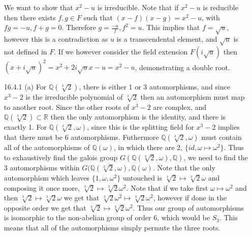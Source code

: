 \documentclass[12pt, letterpaper]{article}
\newcommand{\R}{\mathbb{R}}
\newcommand{\Q}{\mathbb{Q}}
\begin{document}
\begin{enumerate}
	We want to show that $x^2 - u$ is irreducible.  Note that if $x^2 - u$ is reducible then 
	there exists $f,g \in F$ such that $(x-f)(x-g) = x^2 - u$, with $fg = -u, f + g = 0$.  
	Therefore $g = \frac{-u}{f}, f^2 = u$.  This implies that $f = \sqrt{u}$, however this is 
	a contradiction as $u$ is a transcendental element, and $\sqrt{u}$ is not defined in 
	$F$.  If we however consider the field extension $F(i\sqrt{u})$ then 
	$(x + i\sqrt{u})^2 = x^2 + 2i\sqrt{u}x - u = x^2 - u$, demonstrating a double root.  
	\item[16.4.1 (a)] For $\Q(\sqrt[3]{2})$, there is either 1 or 3 automorphisms, 
	and since $x^3 - 2$ is the irreducible polynomial of $\sqrt[3]{2}$ then an automorphism 
	must map to another root.  Since the other roots of $x^3 - 2$ are complex, and 
	$\Q(\sqrt[3]{2}) \subset \R$ then the only automorphism is the identity, and there is 
	exactly 1.  For $\Q(\sqrt[3]{2},\omega)$, since this is the splitting field for 
	$x^3 -2$ implies that there must be 6 automorphisms.  Futhermore $\Q(\sqrt[3]{2},\omega)$
	must contain all of the automorphisms of $\Q(\omega)$, in which there are 2, 
	$\{id, \omega \mapsto \omega^2\}$.  Thus to exhaustively find
	the galois group $G(\Q(\sqrt[3]{2},\omega),\Q)$, we need to find the 3 automorphisms 
	within $G(\Q(\sqrt[3]{2},\omega),\Q(\omega)$.  Note that the only automorphism which leaves
	$\{1,\omega,\omega^2\}$ untouched is $\sqrt[3]{2} \mapsto \sqrt[3]{2} \omega$ and composing 		it once more, $\sqrt[3]{2} \mapsto \sqrt[3]{2} \omega^2$.  Note that if we take first 
	$\omega \mapsto \omega^2 $ and then $\sqrt[3]{2} \mapsto \sqrt[3]{2} \omega$ we get 
	that $\sqrt[3]{2} \omega^2 \mapsto \sqrt[3]{2} \omega^2$, however if done in the opposite 
	order we get that $\sqrt[3]{2} \mapsto \sqrt[3]{2} \omega^2$.  Thus our group of 
	automorphisms is isomorphic to the non-abelian group of order 6, which would be $S_3$.  
	This means that all of the automorphisms simply permute the three roots.    
	\iffalse Note that for $\Q(\sqrt[3]{2})$ there are 3 automorphisms, \\
	$G(\Q(\sqrt[3]{2})/\Q) = \{id, \sqrt[3]{2} \mapsto -\sqrt[3]{2}, 
	\sqrt[3]{2^2} \mapsto -\sqrt[3]{2^2} \}$.  For $\Q(\sqrt[3]{2},\omega)$ there are 6 
	automorphisms, as this is the splitting field for $x^3 - 2$ and 
	$[\Q(\sqrt[3]{2},\omega):\Q] = 6$ as seen previously in the textbook.  Note that 
	$\omega \mapsto \omega^2$ fixes $\Q$ as $(\omega^2)^2 = \omega$, thus only flipping the 
	non-rational complex terms.  Therefore 
	$G(\Q(\sqrt[3]{2},\omega)/\Q) = \{id, \sqrt[3]{2} \mapsto -\sqrt[3]{2}, 
	\sqrt[3]{2^2} \mapsto -\sqrt[3]{2^2}, \omega \mapsto \omega^2,  
	\sqrt[3]{2} \mapsto \sqrt[3]{2} \omega, \sqrt[3]{2} \mapsto \sqrt[3]{2^2} \omega\}$
	\fi
\end{enumerate}
\end{document}
